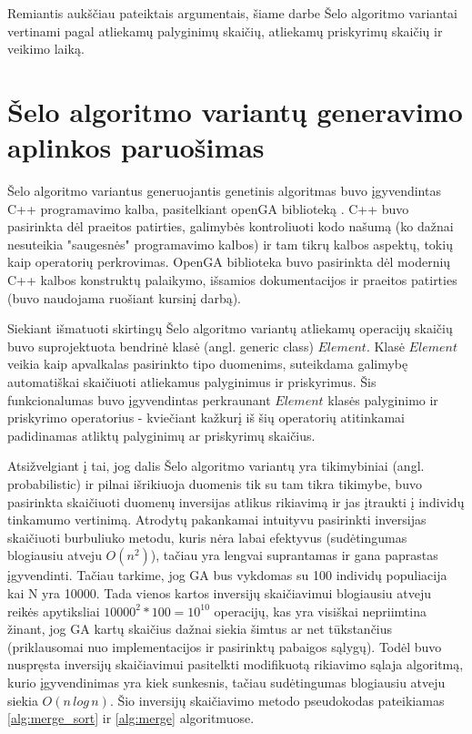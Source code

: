 \documentclass{VUMIFInfKursinis}
\begin{document}
Remiantis aukščiau pateiktais argumentais, šiame darbe Šelo algoritmo variantai vertinami pagal
atliekamų palyginimų skaičių, atliekamų priskyrimų skaičių ir veikimo laiką.

\section{Šelo algoritmo variantų generavimo aplinkos paruošimas}

Šelo algoritmo variantus generuojantis genetinis algoritmas buvo įgyvendintas C++ programavimo kalba, pasitelkiant openGA biblioteką \cite{mohammadi2017openga}.
C++ buvo pasirinkta dėl praeitos patirties, galimybės kontroliuoti kodo našumą (ko dažnai nesuteikia "saugesnės" programavimo kalbos)
ir tam tikrų kalbos aspektų, tokių kaip operatorių perkrovimas.
OpenGA biblioteka buvo pasirinkta dėl modernių C++ kalbos konstruktų palaikymo, išsamios dokumentacijos ir praeitos patirties (buvo naudojama ruošiant kursinį darbą).

Siekiant išmatuoti skirtingų Šelo algoritmo variantų atliekamų operacijų skaičių buvo
suprojektuota bendrinė klasė (angl. generic class) $Element$.
Klasė $Element$ veikia kaip apvalkalas pasirinkto tipo duomenims, suteikdama
galimybę automatiškai skaičiuoti atliekamus palyginimus ir priskyrimus.
Šis funkcionalumas buvo įgyvendintas perkraunant $Element$ klasės palyginimo ir priskyrimo operatorius - kviečiant
kažkurį iš šių operatorių atitinkamai padidinamas atliktų palyginimų ar priskyrimų skaičius.

Atsižvelgiant į tai, jog dalis Šelo algoritmo variantų yra tikimybiniai (angl. probabilistic) ir pilnai išrikiuoja duomenis tik su tam tikra tikimybe,
buvo pasirinkta skaičiuoti duomenų inversijas atlikus rikiavimą ir jas įtraukti į individų tinkamumo vertinimą.
Atrodytų pakankamai intuityvu pasirinkti inversijas skaičiuoti burbuliuko metodu, kuris nėra labai efektyvus (sudėtingumas blogiausiu atveju $O(n^2)$),
tačiau yra lengvai suprantamas ir gana paprastas įgyvendinti.
Tačiau tarkime, jog GA bus vykdomas su 100 individų populiacija kai N yra 10000.
Tada vienos kartos inversijų skaičiavimui blogiausiu atveju reikės apytiksliai $10000^2 * 100 = 10^{10}$ operacijų, kas yra visiškai nepriimtina žinant,
jog GA kartų skaičius dažnai siekia šimtus ar net tūkstančius (priklausomai nuo implementacijos ir pasirinktų pabaigos sąlygų).
Todėl buvo nuspręsta inversijų skaičiavimui pasitelkti modifikuotą rikiavimo sąlaja algoritmą, kurio įgyvendinimas yra kiek sunkesnis, tačiau sudėtingumas blogiausiu atveju siekia $O(n\,log\,n)$.
Šio inversijų skaičiavimo metodo pseudokodas pateikiamas \ref{alg:merge_sort} ir \ref{alg:merge} algoritmuose.
\end{document}

